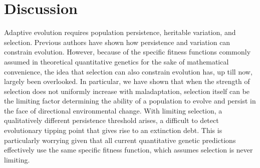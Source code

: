 \documentclass[12pt,letterpaper]{article} %
\begin{document}

\section*{Discussion}

Adaptive evolution requires population persistence, heritable variation, and selection.
Previous authors have shown how persistence \citep[e.g.,][]{Lynch1993,Burger1995} and variation \citep{Gomulkiewicz2009} can constrain evolution.
However, because of the specific fitness functions commonly assumed in theoretical quantitative genetics for the sake of mathematical convenience, the idea that selection can also constrain evolution has, up till now, largely been overlooked. 
In particular, we have shown that when the strength of selection does not uniformly increase with maladaptation, selection itself can be the limiting factor determining the ability of a population to evolve and persist in the face of directional environmental change.
With limiting selection, a qualitatively different persistence threshold arises, a difficult to detect evolutionary tipping point that gives rise to an extinction debt.
This is particularly worrying given that all current quantitative genetic predictions effectively use the same specific fitness function, which assumes selection is never limiting.

\end{document}
